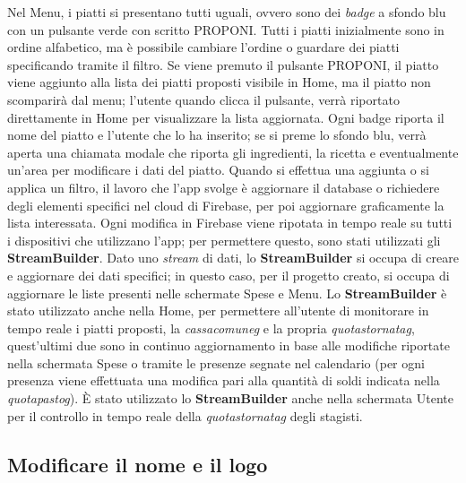 \newline
Nel Menu, i piatti si presentano tutti uguali, ovvero sono dei \emph{badge} a sfondo blu con un pulsante verde con scritto PROPONI.\newline
Tutti i piatti inizialmente sono in ordine alfabetico, ma è possibile cambiare l'ordine o guardare dei piatti specificando tramite il filtro.\newline
Se viene premuto il pulsante PROPONI, il piatto viene aggiunto alla lista dei piatti proposti visibile in Home, ma il piatto non scomparirà dal menu; l'utente quando clicca il pulsante, verrà riportato direttamente in Home per visualizzare la lista aggiornata.\newline
Ogni badge riporta il nome del piatto e l'utente che lo ha inserito; se si preme lo sfondo blu, verrà aperta una chiamata modale che riporta gli ingredienti, la ricetta e eventualmente un'area per modificare i dati del piatto.\newline
\newline
Quando si effettua una aggiunta o si applica un filtro, il lavoro che l'app svolge è aggiornare il database o richiedere degli elementi specifici nel cloud di Firebase, per poi aggiornare graficamente la lista interessata.\newline
Ogni modifica in Firebase viene ripotata in tempo reale su tutti i dispositivi che utilizzano l'app; per permettere questo, sono stati utilizzati gli \textbf{StreamBuilder}.\newline
Dato uno \emph{stream} di dati, lo \textbf{StreamBuilder} si occupa di creare e aggiornare dei dati specifici; in questo caso, per il progetto creato, si occupa di aggiornare le liste presenti nelle schermate Spese e Menu.\newline
\newline
Lo \textbf{StreamBuilder} è stato utilizzato anche nella Home, per permettere all'utente di monitorare in tempo reale i piatti proposti, la \emph{\gls{cassacomuneg}} e la propria \emph{\gls{quotastornatag}}, quest'ultimi due sono in continuo aggiornamento in base alle modifiche riportate nella schermata Spese o tramite le presenze segnate nel calendario (per ogni presenza viene effettuata una modifica pari alla quantità di soldi indicata nella \emph{\gls{quotapastog}}).\newline
È stato utilizzato lo \textbf{StreamBuilder} anche nella schermata Utente per il controllo in tempo reale della \emph{\gls{quotastornatag}} degli stagisti.


\subsection{Modificare il nome e il logo}

